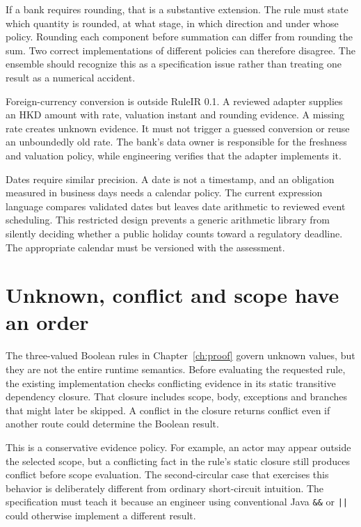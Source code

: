 
If a bank requires rounding, that is a substantive extension. The rule must state
which quantity is rounded, at what stage, in which direction and under whose
policy. Rounding each component before summation can differ from rounding the
sum. Two correct implementations of different policies can therefore disagree.
The ensemble should recognize this as a specification issue rather than treating
one result as a numerical accident.

Foreign-currency conversion is outside RuleIR 0.1. A reviewed adapter supplies an
HKD amount with rate, valuation instant and rounding evidence. A missing rate
creates unknown evidence. It must not trigger a guessed conversion or reuse an
unboundedly old rate. The bank's data owner is responsible for the freshness and
valuation policy, while engineering verifies that the adapter implements it.

Dates require similar precision. A date is not a timestamp, and an obligation
measured in business days needs a calendar policy. The current expression
language compares validated dates but leaves date arithmetic to reviewed event
scheduling. This restricted design prevents a generic arithmetic library from
silently deciding whether a public holiday counts toward a regulatory deadline.
The appropriate calendar must be versioned with the assessment.

\section{Unknown, conflict and scope have an order}
\label{merge:M07:03}


The three-valued Boolean rules in Chapter~\ref{ch:proof} govern unknown values,
but they are not the entire runtime semantics. Before evaluating the requested
rule, the existing implementation checks conflicting evidence in its static
transitive dependency closure. That closure includes scope, body, exceptions and
branches that might later be skipped. A conflict in the closure returns conflict
even if another route could determine the Boolean result.

This is a conservative evidence policy. For example, an actor may appear outside
the selected scope, but a conflicting fact in the rule's static closure still
produces conflict before scope evaluation. The second-circular case that exercises
this behavior is deliberately different from ordinary short-circuit intuition.
The specification must teach it because an engineer using conventional Java
\texttt{\&\&} or \texttt{||} could otherwise implement a different result.

